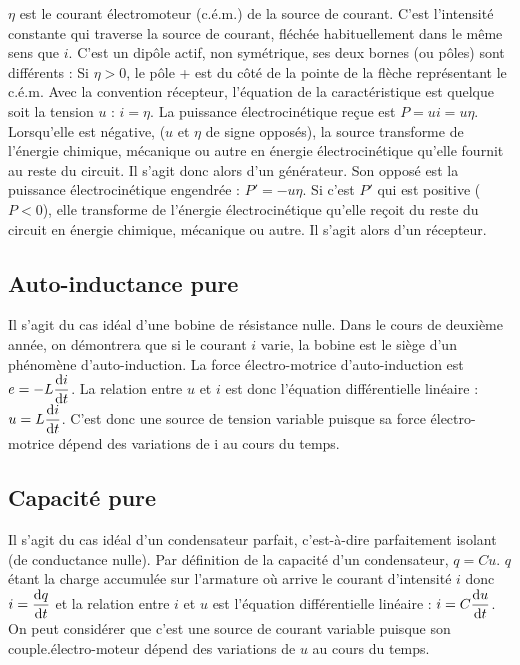 \(\eta\) est le courant électromoteur (c.é.m.) de la source de courant. C'est 
l'intensité constante qui traverse la source de courant, fléchée habituellement 
dans le même sens que \(i\).
C'est un dipôle actif, non symétrique, ses deux bornes (ou pôles) sont 
différents : Si \(\eta > 0\), le pôle + est du côté de la pointe de la flèche 
représentant le c.é.m. Avec la convention récepteur, l'équation de la 
caractéristique est quelque soit la tension \(u\) : \(i=\eta\). La puissance 
électrocinétique reçue est \(P  = u i = u \eta\). Lorsqu'elle est négative, 
(\(u\) et \(\eta\) de signe opposés), la source transforme de l'énergie 
chimique, mécanique ou autre en énergie électrocinétique qu'elle fournit au 
reste du circuit. Il s'agit donc alors d'un générateur. Son opposé est la 
puissance électrocinétique engendrée : \(P' = -u\eta\). Si c'est \(P'\) qui est 
positive (\(P  < 0\)), elle transforme de l'énergie électrocinétique qu'elle 
reçoit du reste du circuit en énergie chimique, mécanique ou autre. Il s'agit 
alors d'un récepteur.

\subsection{Auto-inductance pure}%

Il s'agit du cas idéal d'une bobine de résistance nulle. Dans le cours de 
deuxième année, on démontrera que si le courant \(i\) varie, la bobine est le 
siège d'un phénomène d'auto-induction. La force électro-motrice 
d'auto-induction est \(e = -L\dfrac{\mathrm{d} i}{\mathrm{d} t}\). La relation entre \(u\) et 
\(i\) est donc l'équation différentielle linéaire : \(u = L\dfrac{\mathrm{d} i}{\mathrm{d} t}\). 
C'est donc une source de tension variable puisque sa force électro-motrice 
dépend des variations de i au cours du temps.

\subsection{Capacité pure}%

Il s'agit du cas idéal d'un condensateur parfait, c'est-à-dire parfaitement 
isolant (de conductance nulle). Par définition de la capacité d'un 
condensateur, \(q=Cu\). \(q\) étant la charge accumulée sur l'armature où 
arrive le courant d'intensité \(i\) donc \(i = \dfrac{\mathrm{d} q}{\mathrm{d} t}\)  et la relation 
entre \(i\) et \(u\) est l'équation différentielle linéaire : 
\(i=C\dfrac{\mathrm{d} u}{\mathrm{d} t}\). On peut considérer que c'est une source de courant 
variable puisque son couple.électro-moteur dépend des variations de \(u\) au
cours du temps.

